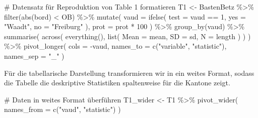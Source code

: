 \documentclass[
  a4paper,
  DIV=11,
  oneside]{scrreprt}
\newenvironment{Shaded}{\begin{snugshade}}{\end{snugshade}}
\newcommand{\AttributeTok}[1]{\textcolor[rgb]{0.40,0.45,0.13}{#1}}
\newcommand{\CommentTok}[1]{\textcolor[rgb]{0.37,0.37,0.37}{#1}}
\newcommand{\DecValTok}[1]{\textcolor[rgb]{0.68,0.00,0.00}{#1}}
\newcommand{\FunctionTok}[1]{\textcolor[rgb]{0.28,0.35,0.67}{#1}}
\newcommand{\NormalTok}[1]{\textcolor[rgb]{0.00,0.23,0.31}{#1}}
\newcommand{\OtherTok}[1]{\textcolor[rgb]{0.00,0.23,0.31}{#1}}
\newcommand{\SpecialCharTok}[1]{\textcolor[rgb]{0.37,0.37,0.37}{#1}}
\newcommand{\StringTok}[1]{\textcolor[rgb]{0.13,0.47,0.30}{#1}}
\begin{document}
\begin{Shaded}
\begin{Highlighting}[]
\CommentTok{\# Datensatz für Reproduktion von Table 1 formatieren}
\NormalTok{T1 }\OtherTok{\textless{}{-}}\NormalTok{ BastenBetz }\SpecialCharTok{\%\textgreater{}\%}
  \FunctionTok{filter}\NormalTok{(}\FunctionTok{abs}\NormalTok{(bord) }\SpecialCharTok{\textless{}}\NormalTok{ OB) }\SpecialCharTok{\%\textgreater{}\%}
  \FunctionTok{mutate}\NormalTok{(}
    \AttributeTok{vaud =} \FunctionTok{ifelse}\NormalTok{(}
      \AttributeTok{test =}\NormalTok{ vaud }\SpecialCharTok{==} \DecValTok{1}\NormalTok{, }
      \AttributeTok{yes =} \StringTok{"Waadt"}\NormalTok{, }
      \AttributeTok{no =} \StringTok{"Freiburg"}
\NormalTok{    ),}
    \AttributeTok{prot =}\NormalTok{ prot }\SpecialCharTok{*} \DecValTok{100}
\NormalTok{  ) }\SpecialCharTok{\%\textgreater{}\%}
  \FunctionTok{group\_by}\NormalTok{(vaud) }\SpecialCharTok{\%\textgreater{}\%}
  \FunctionTok{summarise}\NormalTok{(}
    \FunctionTok{across}\NormalTok{(}
      \FunctionTok{everything}\NormalTok{(), }
      \FunctionTok{list}\NormalTok{(}
        \AttributeTok{Mean =}\NormalTok{ mean, }
        \AttributeTok{SD =}\NormalTok{ sd, }
        \AttributeTok{N =}\NormalTok{ length}
\NormalTok{      )}
\NormalTok{    )}
\NormalTok{  ) }\SpecialCharTok{\%\textgreater{}\%}
  \FunctionTok{pivot\_longer}\NormalTok{(}
    \AttributeTok{cols =} \SpecialCharTok{{-}}\NormalTok{vaud,}
    \AttributeTok{names\_to =} \FunctionTok{c}\NormalTok{(}\StringTok{"variable"}\NormalTok{, }\StringTok{"statistic"}\NormalTok{), }
    \AttributeTok{names\_sep =} \StringTok{"\_"}
\NormalTok{  )}
\end{Highlighting}
\end{Shaded}

Für die tabellarische Darstellung transformieren wir in ein weites
Format, sodass die Tabelle die deskriptive Statistiken spaltenweise für
die Kantone zeigt.

\begin{Shaded}
\begin{Highlighting}[]
\CommentTok{\# Daten in weites Format überführen}
\NormalTok{T1\_wider }\OtherTok{\textless{}{-}}\NormalTok{ T1 }\SpecialCharTok{\%\textgreater{}\%} 
  \FunctionTok{pivot\_wider}\NormalTok{(}
    \AttributeTok{names\_from =} \FunctionTok{c}\NormalTok{(}\StringTok{"vaud"}\NormalTok{, }\StringTok{"statistic"}\NormalTok{)}
\NormalTok{  )}
\end{Highlighting}
\end{Shaded}
\end{document}
